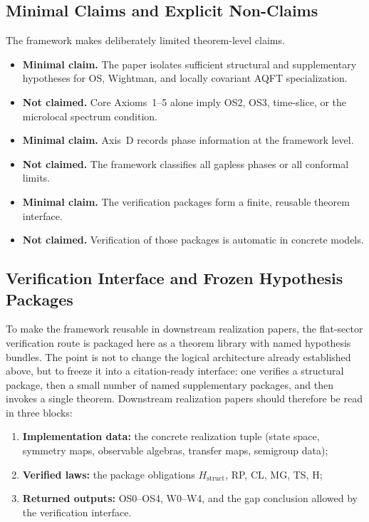 \documentclass[12pt,a4paper]{article}
\theoremstyle{plain}
\theoremstyle{definition}
\theoremstyle{remark}
\begin{document}
\subsection{Minimal Claims and Explicit Non-Claims}

The framework makes deliberately limited theorem-level claims.

\begin{itemize}[nosep]
\item \textbf{Minimal claim.} The paper isolates sufficient
  structural and supplementary hypotheses for OS, Wightman, and
  locally covariant AQFT specialization.
\item \textbf{Not claimed.} Core Axioms~1--5 alone imply OS2, OS3,
  time-slice, or the microlocal spectrum condition.
\item \textbf{Minimal claim.} Axis~D records phase information at the
  framework level.
\item \textbf{Not claimed.} The framework classifies all gapless
  phases or all conformal limits.
\item \textbf{Minimal claim.} The verification packages form a finite,
  reusable theorem interface.
\item \textbf{Not claimed.} Verification of those packages is
  automatic in concrete models.
\end{itemize}

\subsection{Verification Interface and Frozen Hypothesis Packages}
\label{sec:verification-interface}

To make the framework reusable in downstream realization papers, the
flat-sector verification route is packaged here as a theorem library
with named hypothesis bundles. The point is not to change the
logical architecture already established above, but to freeze it into
a citation-ready interface: one verifies a structural package, then a
small number of named supplementary packages, and then invokes a
single theorem. Downstream realization papers should therefore be read
in three blocks:
\begin{enumerate}[nosep,label=(\roman*)]
\item \textbf{Implementation data:} the concrete realization tuple
  (state space, symmetry maps, observable algebras, transfer maps,
  semigroup data);
\item \textbf{Verified laws:} the package obligations
  \(H_{\mathrm{struct}}\), RP, CL, MG, TS, H;
\item \textbf{Returned outputs:} OS0--OS4, W0--W4, and the gap
  conclusion allowed by the verification interface.
\end{enumerate}
\end{document}
